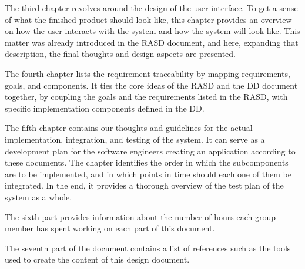 The third chapter revolves around the design of the user interface. To get a sense of what the finished product should look like, this chapter provides an overview on how the user interacts with the system and how the system will look like. This matter was already introduced in the RASD document, and here, expanding that description, the final thoughts and design aspects are presented. \newline

The fourth chapter lists the requirement traceability by mapping requirements, goals, and components. It ties the core ideas of the RASD and the DD document together, by coupling the goals and the requirements listed in the RASD, with specific implementation components defined in the DD. \newline 

The fifth chapter contains our thoughts and guidelines for the actual implementation, integration, and testing of the system. It can serve as a development plan for the software engineers creating an application according to these documents. The chapter identifies the order in which the subcomponents are to be implemented, and in which points in time should each one of them be integrated. In the end, it provides a thorough overview of the test plan of the system as a whole. \newline

The sixth part provides information about the number of hours each group member has spent working on each part of this document. \newline

The seventh part of the document contains a list of references such as the tools used to create the content of this design document. \newline
